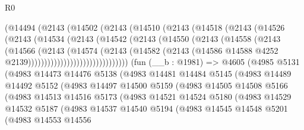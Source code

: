 \begin{lexlean}{R0}
\begin{coremodule}
                (@14494
                  (@2143
                    (@14502
                      (@2143
                        (@14510
                          (@2143
                            (@14518
                              (@2143
                                (@14526
                                  (@2143
                                    (@14534
                                      (@2143
                                        (@14542
                                          (@2143
                                            (@14550
                                              (@2143
                                                (@14558
                                                  (@2143
                                                    (@14566
                                                      (@2143
                                                        (@14574
                                                          (@2143
                                                            (@14582
                                                              (@2143
                                                                (@14586
                                                                  @14588
                                                                  @4252
                                                                  @2139)))))))))))))))))))))))))))))))
    (fun (__b : @1981) =>
    @4605
      (@4985
        @5131
        (@4983
          @14473
          @14476
          @5138
          (@4983
            @14481
            @14484
            @5145
            (@4983
              @14489
              @14492
              @5152
              (@4983
                @14497
                @14500
                @5159
                (@4983
                  @14505
                  @14508
                  @5166
                  (@4983
                    @14513
                    @14516
                    @5173
                    (@4983
                      @14521
                      @14524
                      @5180
                      (@4983
                        @14529
                        @14532
                        @5187
                        (@4983
                          @14537
                          @14540
                          @5194
                          (@4983
                            @14545
                            @14548
                            @5201
                            (@4983
                              @14553
                              @14556

\end{coremodule}
\end{lexlean}
